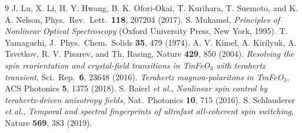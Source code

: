 \documentclass[aps,prb,twocolumn,superscriptaddress,longbibliography]{revtex4-2}
\begin{document}
\begin{thebibliography}{9}
 J. Lu, X. Li, H. Y. Hwang, B. K. Ofori-Okai,
  T. Kurihara, T. Suemoto, and K. A. Nelson,
  Phys.\ Rev.\ Lett.\ \textbf{118}, 207204 (2017).
 S. Mukamel, \emph{Principles of Nonlinear Optical
  Spectroscopy} (Oxford University Press, New York, 1995).
 T. Yamaguchi,
  J.\ Phys.\ Chem.\ Solids \textbf{35}, 479 (1974).
 A. V. Kimel, A. Kirilyuk, A. Tsvetkov, R. V.
  Pisarev, and Th. Rasing, Nature \textbf{429}, 850 (2004).
 \emph{Resolving the spin reorientation and
  crystal-field transitions in TmFeO$_3$ with terahertz transient},
  Sci.\ Rep.\ \textbf{6}, 23648 (2016).
 \emph{Terahertz magnon-polaritons in TmFeO$_3$},
  ACS Photonics \textbf{5}, 1375 (2018).
 S. Baierl \emph{et al.}, \emph{Nonlinear spin
  control by terahertz-driven anisotropy fields},
  Nat.\ Photonics \textbf{10}, 715 (2016).
 S. Schlauderer \emph{et al.}, \emph{Temporal
  and spectral fingerprints of ultrafast all-coherent spin switching},
  Nature \textbf{569}, 383 (2019).
\end{thebibliography}
\end{document}
